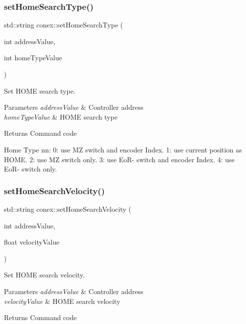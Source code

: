 \subsubsection{\texorpdfstring{set\+Home\+Search\+Type()}{setHomeSearchType()}}
{\footnotesize\ttfamily std\+::string conex\+::set\+Home\+Search\+Type (\begin{DoxyParamCaption}\item[{int}]{address\+Value,  }\item[{int}]{home\+Type\+Value }\end{DoxyParamCaption})}



Set H\+O\+ME search type. 


\begin{DoxyParams}{Parameters}
{\em address\+Value} & Controller address \\
\hline
{\em home\+Type\+Value} & H\+O\+ME search type \\
\hline
\end{DoxyParams}
\begin{DoxyReturn}{Returns}
Command code 
\end{DoxyReturn}
Home Type nn\+: 0\+: use MZ switch and encoder Index. 1\+: use current position as H\+O\+ME. 2\+: use MZ switch only. 3\+: use Eo\+R-\/ switch and encoder Index. 4\+: use Eo\+R-\/ switch only.\mbox{\label{namespaceconex_ae0d284374b70f666fa8cad9bb3c81aa4}} 
\subsubsection{\texorpdfstring{set\+Home\+Search\+Velocity()}{setHomeSearchVelocity()}}
{\footnotesize\ttfamily std\+::string conex\+::set\+Home\+Search\+Velocity (\begin{DoxyParamCaption}\item[{int}]{address\+Value,  }\item[{float}]{velocity\+Value }\end{DoxyParamCaption})}



Set H\+O\+ME search velocity. 


\begin{DoxyParams}{Parameters}
{\em address\+Value} & Controller address \\
\hline
{\em velocity\+Value} & H\+O\+ME search velocity \\
\hline
\end{DoxyParams}
\begin{DoxyReturn}{Returns}
Command code 
\end{DoxyReturn}
\mbox{\label{namespaceconex_a3a057c09b112f734431cb331669bc46b}} 
